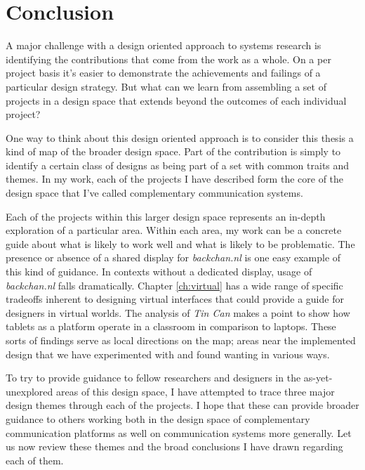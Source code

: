 \chapter{Conclusion}

A major challenge with a design oriented approach to systems research is identifying the contributions that come from the work as a whole. On a per project basis it's easier to demonstrate the achievements and failings of a particular design strategy. But what can we learn from assembling a set of projects in a design space that extends beyond the outcomes of each individual project?

One way to think about this design oriented approach is to consider this thesis a kind of map of the broader design space. Part of the contribution is simply to identify a certain class of designs as being part of a set with common traits and themes. In my work, each of the projects I have described form the core of the design space that I've called complementary communication systems. 

Each of the projects within this larger design space represents an in-depth exploration of a particular area. Within each area, my work can be a concrete guide about what is likely to work well and what is likely to be problematic. The presence or absence of a shared display for \emph{backchan.nl} is one easy example of this kind of guidance. In contexts without a dedicated display, usage of \emph{backchan.nl} falls dramatically. Chapter \ref{ch:virtual} has a wide range of specific tradeoffs inherent to designing virtual interfaces that could provide a guide for designers in virtual worlds. The analysis of \emph{Tin Can} makes a point to show how tablets as a platform operate in a classroom in comparison to laptops. These sorts of findings serve as local directions on the map; areas near the implemented design that we have experimented with and found wanting in various ways.

To try to provide guidance to fellow researchers and designers in the as-yet-unexplored areas of this design space, I have attempted to trace three major design themes through each of the projects. I hope that these can provide broader guidance to others working both in the design space of complementary communication platforms as well on communication systems more generally. Let us now review these themes and the broad conclusions I have drawn regarding each of them.




